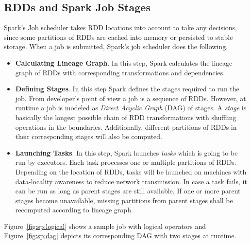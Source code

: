 \subsection{RDDs and Spark Job Stages}
\label{sp:stage}
Spark's Job scheduler takes RDD locations into account to take any decisions, since some partitions of RDDs are cached into memory or persisted to stable storage. When a job is submitted, Spark's job scheduler does the following.
\begin{itemize}
    \item \textbf{Calculating Lineage Graph}. In this step, Spark calculates the lineage graph of RDDs with corresponding transformations and dependencies.
    \item \textbf{Defining Stages}. In this step Spark defines the stages required to run the job. From developer's point of view a job is a sequence of RDDs. However, at runtime a job is modeled as \emph{Direct Acyclic Graph} (DAG) of stages. A \emph{stage} is basically the longest possible chain of RDD transformations with shuffling operations in the boundaries. Additionally, different partitions of RDDs in their corresponding stages will also be computed. 
    \item \textbf{Launching Tasks}. In this step, Spark launches \emph{tasks} which is going to be run by executors. Each task processes one or multiple partitions of RDDs. Depending on the location of RDDs, tasks will be launched on machines with data-locality awareness to reduce network transmission. In case a task fails, it can be run as long as parent stages are still available. If one or more parent stages become unavailable, missing partitions from parent stages shall be recomputed according to lineage graph.
\end{itemize}
Figure~\ref{fig:sp:logical} shows a sample job with logical operators and Figure~\ref{fig:sp:dag} depicts its corresponding DAG with two stages at runtime.
